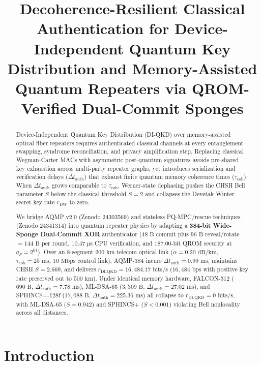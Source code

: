 \documentclass[conference,compsoc]{IEEEtran}
\title{Decoherence-Resilient Classical Authentication for Device-Independent Quantum Key Distribution and Memory-Assisted Quantum Repeaters via QROM-Verified Dual-Commit Sponges}
\author{\IEEEauthorblockN{Laudza Kusuma}
\IEEEauthorblockA{Independent Researcher\\
\texttt{laudza@aqmp.protocol}\\
\texttt{DOI: https://doi.org/10.5281/zenodo.24343601}}}
\begin{document}
\maketitle

\begin{abstract}
Device-Independent Quantum Key Distribution (DI-QKD) over memory-assisted optical fiber repeaters requires authenticated classical channels at every entanglement swapping, syndrome reconciliation, and privacy amplification step. Replacing classical Wegman-Carter MACs with asymmetric post-quantum signatures avoids pre-shared key exhaustion across multi-party repeater graphs, yet introduces serialization and verification delays ($\Delta t_{\text{auth}}$) that exhaust finite quantum memory coherence times ($\tau_{\text{coh}}$). When $\Delta t_{\text{auth}}$ grows comparable to $\tau_{\text{coh}}$, Werner-state dephasing pushes the CHSH Bell parameter $S$ below the classical threshold $S = 2$ and collapses the Devetak-Winter secret key rate $r_{\text{DW}}$ to zero.

We bridge AQMP v2.0 (Zenodo 24303569) and stateless PQ-MPC/rescue techniques (Zenodo 24341314) into quantum repeater physics by adapting a \textbf{384-bit Wide-Sponge Dual-Commit XOR} authenticator ($48\text{ B}$ commit plus $96\text{ B}$ reveal/rotate $= 144\text{ B}$ per round, $10.47\ \mu\text{s}$ CPU verification, and $187.00\text{-bit}$ QROM security at $q_F = 2^{64}$). Over an $8$-segment $200\text{ km}$ telecom optical link ($\alpha = 0.20\text{ dB/km}$, $\tau_{\text{coh}} = 25\text{ ms}$, $10\text{ Mbps}$ control link), AQMP-384 incurs $\Delta t_{\text{auth}} = 0.99\text{ ms}$, maintains CHSH $S = 2.669$, and delivers $r_{\text{DI-QKD}} = 16{,}484.17\text{ bits/s}$ ($16{,}484\text{ bps}$ with positive key rate preserved out to $500\text{ km}$). Under identical memory hardware, FALCON-512 ($690\text{ B}$, $\Delta t_{\text{auth}} = 7.78\text{ ms}$), ML-DSA-65 ($3{,}309\text{ B}$, $\Delta t_{\text{auth}} = 27.02\text{ ms}$), and SPHINCS+-128f ($17{,}088\text{ B}$, $\Delta t_{\text{auth}} = 225.36\text{ ms}$) all collapse to $r_{\text{DI-QKD}} = 0\text{ bits/s}$, with ML-DSA-65 ($S = 0.942$) and SPHINCS+ ($S < 0.001$) violating Bell nonlocality across all distances.
\end{abstract}

\section{Introduction}
\label{sec:intro}
\end{document}

